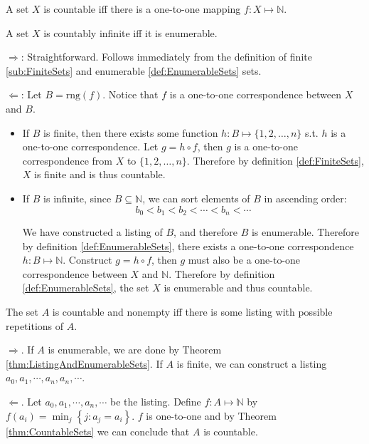\begin{theorem}
    \label{thm:CountableSets}
    A set $X$ is countable iff there is a one-to-one mapping $f: X \mapsto \mathbb{N}$.

    A set $X$ is countably infinite iff it is enumerable.
\end{theorem}
\begin{sketchproof}
    $\Rightarrow$: Straightforward. Follows immediately from the definition of finite \ref{sub:FiniteSets} and enumerable \ref{def:EnumerableSets} sets.
    
    $\Leftarrow$: Let $B = \textrm{rng}(f)$. Notice that $f$ is a one-to-one correspondence between $X$ and $B$.
    \begin{itemize}
        \item If $B$ is finite, then there exists some function $h: B \mapsto \{1,2,\dots,n\}$ s.t. $h$ is a one-to-one correspondence. Let $g = h \circ f$, then $g$ is a one-to-one correspondence from $X$ to $\{1,2,\dots,n\}$. Therefore by definition \ref{def:FiniteSets}, $X$ is finite and is thus countable.
        
        \item If $B$ is infinite, since $B \subseteq \mathbb{N}$, we can sort elements of $B$ in ascending order:
        \[ b_0 < b_1 < b_2 < \cdots < b_n < \cdots \]
        
        We have constructed a listing of $B$, and therefore $B$ is enumerable. Therefore by definition \ref{def:EnumerableSets}, there exists a one-to-one correspondence $h:B \mapsto \mathbb{N}$. Construct $g = h \circ f$, then $g$ must also be a one-to-one correspondence between $X$ and $\mathbb{N}$. Therefore by definition \ref{def:EnumerableSets}, the set $X$ is enumerable and thus countable.
    \end{itemize}
\end{sketchproof}

\begin{theorem}
    \label{thm:ListingAndCountableSets}
    The set $A$ is countable and nonempty iff there is some listing with possible repetitions of $A$.
\end{theorem}
\begin{sketchproof}
    $\Rightarrow$. If $A$ is enumerable, we are done by Theorem \ref{thm:ListingAndEnumerableSets}. If $A$ is finite, we can construct a listing $a_0, a_1, \cdots, a_n, a_n, \cdots$.

    $\Leftarrow$. Let $a_0, a_1, \cdots, a_n, \cdots$ be the listing. Define $f:A \mapsto \mathbb{N}$ by $f(a_i) = \min_j\left\{ j: a_j=a_i \right\}$. $f$ is one-to-one and by Theorem \ref{thm:CountableSets} we can conclude that $A$ is countable.
\end{sketchproof}

